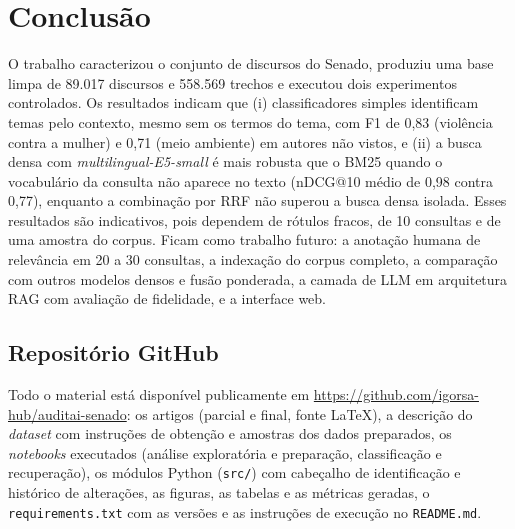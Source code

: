 \documentclass[12pt]{article}
\newcommand{\githuburl}{\url{https://github.com/igorsa-hub/auditai-senado}}
\begin{document}
\section{Conclusão}

O trabalho caracterizou o conjunto de discursos do Senado, produziu uma base limpa de 89.017
discursos e 558.569 trechos e executou dois experimentos controlados. Os resultados indicam que
(i) classificadores simples identificam temas pelo contexto, mesmo sem os termos do tema, com F1
de 0,83 (violência contra a mulher) e 0,71 (meio ambiente) em autores não vistos, e (ii) a busca
densa com \textit{multilingual-E5-small} é mais robusta que o BM25 quando o vocabulário da consulta
não aparece no texto (nDCG@10 médio de 0,98 contra 0,77), enquanto a combinação por RRF não
superou a busca densa isolada. Esses resultados são indicativos, pois dependem de rótulos fracos,
de 10 consultas e de uma amostra do corpus. Ficam como trabalho futuro: a anotação humana de
relevância em 20 a 30 consultas, a indexação do corpus completo, a comparação com outros modelos
densos e fusão ponderada, a camada de LLM em arquitetura RAG com avaliação de fidelidade, e a
interface web.

\subsection{Repositório GitHub}

Todo o material está disponível publicamente em \githuburl: os artigos (parcial e final, fonte
\LaTeX), a descrição do \textit{dataset} com instruções de obtenção e amostras dos dados
preparados, os \textit{notebooks} executados (análise exploratória e preparação, classificação e
recuperação), os módulos Python (\texttt{src/}) com cabeçalho de identificação e histórico de
alterações, as figuras, as tabelas e as métricas geradas, o \texttt{requirements.txt} com as
versões e as instruções de execução no \texttt{README.md}.



\end{document}
